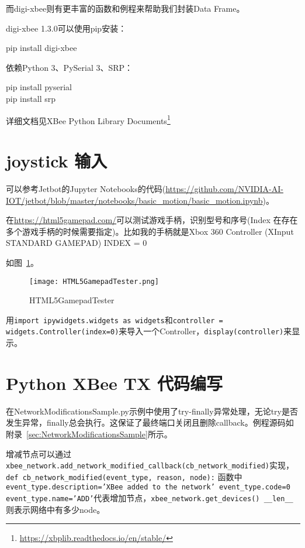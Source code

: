 而digi-xbee则有更丰富的函数和例程来帮助我们封装Data Frame。

digi-xbee 1.3.0可以使用pip安装：

\begin{tcolorbox}
    pip install digi-xbee
\end{tcolorbox}

依赖Python 3、PySerial 3、SRP：

\begin{tcolorbox}
    pip install pyserial \\
    pip install srp
\end{tcolorbox}

详细文档见XBee Python Library Documents\footnote{\url{https://xbplib.readthedocs.io/en/stable/}}

\section{joystick 输入}

可以参考Jetbot的Jupyter Notebooks的代码(\url{https://github.com/NVIDIA-AI-IOT/jetbot/blob/master/notebooks/basic_motion/basic_motion.ipynb})。

在\url{https://html5gamepad.com/}可以测试游戏手柄，识别型号和序号(Index 在存在多个游戏手柄的时候需要指定)。比如我的手柄就是Xbox 360 Controller (XInput STANDARD GAMEPAD) INDEX = 0

如图~\ref{fig:HTML5GamepadTester}。

\begin{figure}[htbp]
    \centering
    \texttt{[image: HTML5GamepadTester.png]}
    \caption{HTML5GamepadTester}
    \label{fig:HTML5GamepadTester}
\end{figure}

用\texttt{import ipywidgets.widgets as widgets}和\texttt{controller = widgets.Controller(index=0)}来导入一个Controller，\texttt{display(controller)}来显示。

\section{Python XBee TX 代码编写}

在NetworkModificationsSample.py示例中使用了try-finally异常处理，无论try是否发生异常，finally总会执行。这保证了最终端口关闭且删除callback。例程源码如附录~\ref{sec:NetworkModificationsSample}所示。

增减节点可以通过\texttt{xbee_network.add_network_modified_callback(cb_network_modified)}实现，\texttt{def cb_network_modified(event_type, reason, node):} 函数中\texttt{event_type.description='XBee added to the network' event_type.code=0 event_type.name='ADD'}代表增加节点，\texttt{xbee_network.get_devices() __len__}则表示网络中有多少node。

